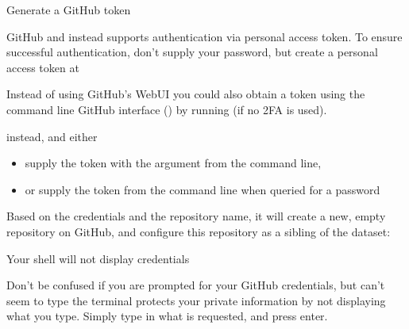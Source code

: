 \ignorespaces \begin{importantnote}[label={index-13}, before title={\thetcbcounter\ }, check odd page=true]{Generate a GitHub token}
\label{\detokenize{basics/101-130-yodaproject:index-13}}

\sphinxAtStartPar
GitHub  and instead supports authentication via personal access token.
To ensure successful authentication, don’t supply your password, but create a personal access token at %
\begin{footnote}\sphinxAtStartFootnote
Instead of using GitHub’s WebUI you could also obtain a token using the command line GitHub interface () by running  (if no 2FA is used).
%
\end{footnote} instead, and either
\begin{itemize}
\item {} 
\sphinxAtStartPar
supply the token with the argument  from the command line,

\item {} 
\sphinxAtStartPar
or supply the token from the command line when queried for a password

\end{itemize}


\end{importantnote}

\sphinxAtStartPar
Based on the credentials and the
repository name, it will create a new, empty repository on GitHub, and
configure this repository as a sibling of the dataset:

\ignorespaces \begin{windowswit}[label={index-14}, before title={\thetcbcounter\ }, check odd page=true]{Your shell will not display credentials}
\label{\detokenize{basics/101-130-yodaproject:index-14}}

\sphinxAtStartPar
Don’t be confused if you are prompted for your GitHub credentials, but can’t seem to type \textendash{} the terminal protects your private information by not displaying what you type.
Simply type in what is requested, and press enter.


\end{windowswit}


